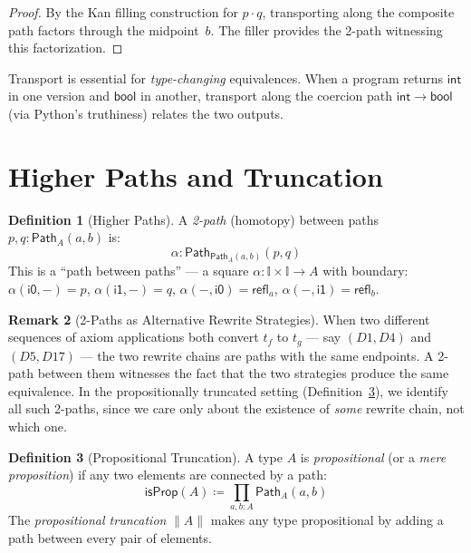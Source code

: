 \documentclass[11pt,a4paper]{report}
\theoremstyle{definition}
\newtheorem{definition}{Definition}[chapter]
\newtheorem{remark}[definition]{Remark}
\theoremstyle{plain}
\newcommand{\Path}{\mathsf{Path}}
\newcommand{\interval}{\mathbb{I}}
\begin{document}
\begin{proof}
By the Kan filling construction for $p \cdot q$, transporting along
the composite path factors through the midpoint~$b$.  The filler
provides the 2-path witnessing this factorization.
\end{proof}

Transport is essential for \emph{type-changing} equivalences.  When
a program returns $\mathsf{int}$ in one version and $\mathsf{bool}$
in another, transport along the coercion path $\mathsf{int} \to
\mathsf{bool}$ (via Python's truthiness) relates the two outputs.

\section{Higher Paths and Truncation}
\label{sec:higher-paths}

\begin{definition}[Higher Paths]
A \emph{2-path} (homotopy) between paths $p, q : \Path_A(a, b)$ is:
\[
  \alpha : \Path_{\Path_A(a,b)}(p, q)
\]
This is a ``path between paths'' --- a square
$\alpha : \interval \times \interval \to A$ with boundary:
$\alpha(\mathsf{i0}, -) = p$, $\alpha(\mathsf{i1}, -) = q$,
$\alpha(-, \mathsf{i0}) = \mathsf{refl}_a$,
$\alpha(-, \mathsf{i1}) = \mathsf{refl}_b$.
\end{definition}

\begin{remark}[2-Paths as Alternative Rewrite Strategies]
When two different sequences of axiom applications both convert
$t_f$ to $t_g$ --- say $(D1, D4)$ and $(D5, D17)$ --- the two
rewrite chains are paths with the same endpoints.  A 2-path between
them witnesses the fact that the two strategies produce the same
equivalence.  In the propositionally truncated setting
(Definition~\ref{def:prop-trunc}), we identify all such 2-paths,
since we care only about the existence of \emph{some} rewrite chain,
not which one.
\end{remark}

\begin{definition}[Propositional Truncation]
\label{def:prop-trunc}
A type $A$ is \emph{propositional} (or a \emph{mere proposition}) if
any two elements are connected by a path:
\[
  \mathsf{isProp}(A) \coloneqq \prod_{a, b : A} \Path_A(a, b)
\]
The \emph{propositional truncation} $\|A\|$ makes any type
propositional by adding a path between every pair of elements.
\end{definition}
\end{document}

